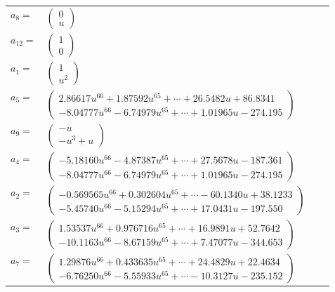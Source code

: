 \documentclass[1p]{elsarticle_modified}
\theoremstyle{definition}
\begin{document}
\begin{tabular}{m{7pt} m{180pt} m{7pt} m{180pt} }
\flushright $a_{8}=$&$\begin{pmatrix}0\\u\end{pmatrix}$ \\
\flushright $a_{12}=$&$\begin{pmatrix}1\\0\end{pmatrix}$ \\
\flushright $a_{1}=$&$\begin{pmatrix}1\\u^2\end{pmatrix}$ \\
\flushright $a_{5}=$&$\begin{pmatrix}2.86617 u^{66}+1.87592 u^{65}+\cdots+26.5482 u+86.8341\\-8.04777 u^{66}-6.74979 u^{65}+\cdots+1.01965 u-274.195\end{pmatrix}$ \\
\flushright $a_{9}=$&$\begin{pmatrix}- u\\- u^3+u\end{pmatrix}$ \\
\flushright $a_{4}=$&$\begin{pmatrix}-5.18160 u^{66}-4.87387 u^{65}+\cdots+27.5678 u-187.361\\-8.04777 u^{66}-6.74979 u^{65}+\cdots+1.01965 u-274.195\end{pmatrix}$ \\
\flushright $a_{2}=$&$\begin{pmatrix}-0.569565 u^{66}+0.302604 u^{65}+\cdots-60.1340 u+38.1233\\-5.45740 u^{66}-5.15294 u^{65}+\cdots+17.0431 u-197.550\end{pmatrix}$ \\
\flushright $a_{3}=$&$\begin{pmatrix}1.53537 u^{66}+0.976716 u^{65}+\cdots+16.9891 u+52.7642\\-10.1163 u^{66}-8.67159 u^{65}+\cdots+7.47077 u-344.653\end{pmatrix}$ \\
\flushright $a_{7}=$&$\begin{pmatrix}1.29876 u^{66}+0.433635 u^{65}+\cdots+24.4829 u+22.4634\\-6.76250 u^{66}-5.55933 u^{65}+\cdots-10.3127 u-235.152\end{pmatrix}$ \\

\end{tabular}
\end{document}
